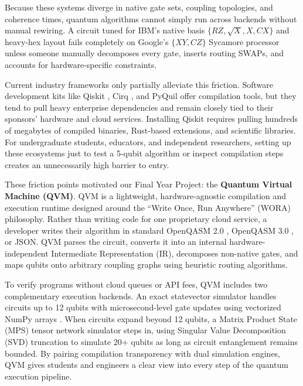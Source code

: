 Because these systems diverge in native gate sets, coupling topologies, and coherence times, quantum algorithms cannot simply run across backends without manual rewiring. A circuit tuned for IBM's native basis $\{RZ, \sqrt{X}, X, CX\}$ and heavy-hex layout fails completely on Google's $\{XY, CZ\}$ Sycamore processor unless someone manually decomposes every gate, inserts routing SWAPs, and accounts for hardware-specific constraints.

Current industry frameworks only partially alleviate this friction. Software development kits like Qiskit \cite{qiskit2023}, Cirq \cite{cirq2020}, and PyQuil offer compilation tools, but they tend to pull heavy enterprise dependencies and remain closely tied to their sponsors' hardware and cloud services. Installing Qiskit requires pulling hundreds of megabytes of compiled binaries, Rust-based extensions, and scientific libraries. For undergraduate students, educators, and independent researchers, setting up these ecosystems just to test a 5-qubit algorithm or inspect compilation steps creates an unnecessarily high barrier to entry.

These friction points motivated our Final Year Project: the \textbf{Quantum Virtual Machine (QVM)}. QVM is a lightweight, hardware-agnostic compilation and execution runtime designed around the ``Write Once, Run Anywhere'' (WORA) philosophy. Rather than writing code for one proprietary cloud service, a developer writes their algorithm in standard OpenQASM 2.0 \cite{cross2017qasm}, OpenQASM 3.0 \cite{cross2022qasm3}, or JSON. QVM parses the circuit, converts it into an internal hardware-independent Intermediate Representation (IR), decomposes non-native gates, and maps qubits onto arbitrary coupling graphs using heuristic routing algorithms.

To verify programs without cloud queues or API fees, QVM includes two complementary execution backends. An exact statevector simulator handles circuits up to 12 qubits with microsecond-level gate updates using vectorized NumPy arrays \cite{numpy2020}. When circuits expand beyond 12 qubits, a Matrix Product State (MPS) tensor network simulator \cite{vidal2003mps} steps in, using Singular Value Decomposition (SVD) truncation to simulate 20+ qubits as long as circuit entanglement remains bounded. By pairing compilation transparency with dual simulation engines, QVM gives students and engineers a clear view into every step of the quantum execution pipeline.


